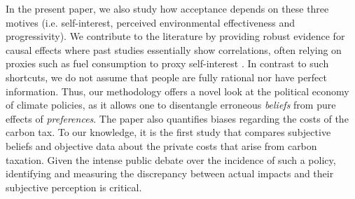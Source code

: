 \documentclass[11pt]{article}
\begin{document}
In the present paper, we also study how acceptance depends on these three motives (i.e. self-interest, perceived environmental effectiveness and progressivity). We contribute to the literature by providing robust evidence for causal effects where past studies essentially show correlations, often relying on proxies such as fuel consumption to proxy self-interest \citep[e.g.][]{thalmann_public_2004,kallbekken_saelen_2011,anderson_can_2019}. In contrast to such shortcuts, we do not assume that people are fully rational nor have perfect information. Thus, our methodology offers a novel look at the political economy of climate policies, as it allows one to disentangle erroneous \emph{beliefs} from pure effects of \emph{preferences}. The paper also quantifies biases regarding the costs of the carbon tax. To our knowledge, it is the first study that compares subjective beliefs and objective data about the private costs that arise from carbon taxation. Given the intense public debate over the incidence of such a policy, identifying and measuring the discrepancy between actual impacts and their subjective perception is critical.
\end{document}
